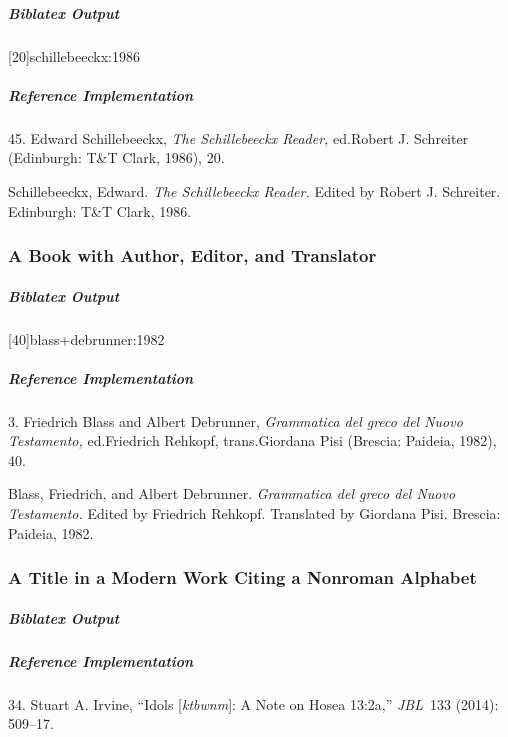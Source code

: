 \documentclass[a4paper]{article}
\newenvironment{biboutput}{%
  \subparagraph{Biblatex Output}
}{\color{black}}
\newenvironment{refimp}{%
  \subparagraph{Reference Implementation}
  \color{reference-colour}
  \rm
}{\par\color{black}}
\begin{document}
\begin{biboutput}
  [20]{schillebeeckx:1986}
\end{biboutput}

\begin{refimp}
  \hspace*{\bibindent}45. Edward Schillebeeckx, \emph{The Schillebeeckx
  Reader,} ed.\@ Robert J. Schreiter (Edinburgh: T\&T Clark, 1986), 20.

  \hangindent\bibindent Schillebeeckx, Edward. \emph{The Schillebeeckx
  Reader.} Edited by Robert J. Schreiter. Edinburgh: T\&T Clark, 1986.
\end{refimp}

\subsubsection{A Book with Author, Editor, and Translator}

\begin{biboutput}
  [40]{blass+debrunner:1982}
\end{biboutput}

\begin{refimp}
  \hspace*{\bibindent}3. Friedrich Blass and Albert Debrunner,
  \emph{Grammatica del greco del Nuovo Testamento,} ed.\@ Friedrich Rehkopf,
  trans.\@ Giordana Pisi (Brescia: Paideia, 1982), 40.

  \hangindent\bibindent Blass, Friedrich, and Albert Debrunner.
  \emph{Grammatica del greco del Nuovo Testamento.} Edited by Friedrich
  Rehkopf. Translated by Giordana Pisi. Brescia: Paideia, 1982.
\end{refimp}

\subsubsection{A Title in a Modern Work Citing a Nonroman Alphabet}

\begin{biboutput}
\end{biboutput}

\begin{refimp}
  \hspace*{\bibindent}34. Stuart A. Irvine, “Idols [\emph{ktbwnm}]: A Note on
  Hosea 13:2a,” \emph{JBL}~133 (2014): 509–17.

\end{refimp}
\end{document}
